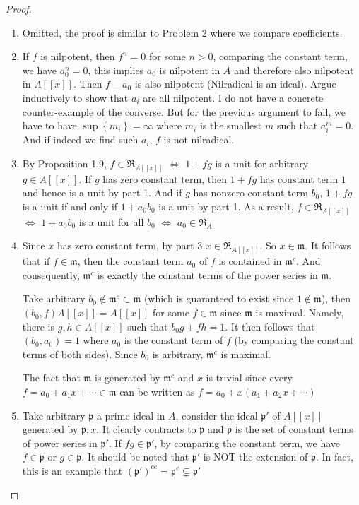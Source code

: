 \documentclass{solution}
\begin{document}
\begin{proof}
    \begin{enumerate}
        \item Omitted, the proof is similar to Problem 2 where we compare coefficients.
        \item If $f$ is nilpotent, then $f^n = 0$ for some $n \gt 0$, comparing the constant term, we have $a_0^n = 0$, this implies $a_0$ is nilpotent in $A$ and therefore also nilpotent in $A[[x]]$. Then $f - a_0$ is also nilpotent (Nilradical is an ideal). Argue inductively to show that $a_i$ are all nilpotent. I do not have a concrete counter-example of the converse. But for the previous argument to fail, we have to have $\sup \left\lbrace m_i \right\rbrace = \infty$ where $m_i$ is the smallest $m$ such that $a_i^m = 0$. And if indeed we find such $a_i$, $f$ is not nilradical.
        \item By Proposition 1.9, $f \in \mathfrak{R}_{A[[x]]}$ $\Leftrightarrow$ $1 + fg$ is a unit for arbitrary $g \in A[[x]]$. If $g$ has zero constant term, then $1 + fg$ has constant term $1$ and hence is a unit by part 1. And if $g$ has nonzero constant term $b_0$, $1 + fg$ is a unit if and only if $1 + a_0b_0$ is a unit by part 1. As a result, $f \in \mathfrak{R}_{A[[x]]}$ $\Leftrightarrow$ $1 + a_0b_0$ is a unit for all $b_0$ $\Leftrightarrow$ $a_0 \in \mathfrak{R}_{A}$
        \item Since $x$ has zero constant term, by part 3 $x \in \mathfrak{R}_{A[[x]]}$. So $x \in \mathfrak{m}$. It follows that if $f \in \mathfrak{m}$, then the constant term $a_0$ of $f$ is contained in $\mathfrak{m}^c$. And consequently, $\mathfrak{m}^c$ is exactly the constant terms of the power series in $\mathfrak{m}$.
        
        Take arbitrary $b_0 \notin \mathfrak{m}^c \subset \mathfrak{m}$ (which is guaranteed to exist since $1 \notin \mathfrak{m}$), then $(b_0, f)A[[x]] = A[[x]]$ for some $f \in \mathfrak{m}$ since $\mathfrak{m}$ is maximal. Namely, there is $g, h \in A[[x]]$ such that $b_0g + fh = 1$. It then follows that $(b_0, a_0) = 1$ where $a_0$ is the constant term of $f$ (by comparing the constant terms of both sides). Since $b_0$ is arbitrary, $\mathfrak{m}^c$ is maximal.
        
        The fact that $\mathfrak{m}$ is generated by $\mathfrak{m}^c$ and $x$ is trivial since every $f = a_0 + a_1x + \cdots \in \mathfrak{m}$ can be written as $f = a_0 + x(a_1 + a_2x + \cdots)$

        \item Take arbitrary $\mathfrak{p}$ a prime ideal in $A$, consider the ideal $\mathfrak{p}'$ of $A[[x]]$ generated by $\mathfrak{p}, x$. It clearly contracts to $\mathfrak{p}$ and $\mathfrak{p}$ is the set of constant terms of power series in $\mathfrak{p}'$. If $fg \in \mathfrak{p}'$, by comparing the constant term, we have $f \in \mathfrak{p}$ or $g \in \mathfrak{p}$. {\color{red} It should be noted that $\mathfrak{p}'$ is NOT the extension of $\mathfrak{p}$. In fact, this is an example that $(\mathfrak{p}')^{ce} = \mathfrak{p}^e \subsetneq \mathfrak{p}'$}
    \end{enumerate}
\end{proof}
\end{document}
